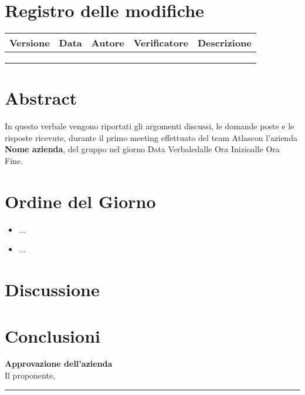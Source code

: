 \documentclass[a4paper,12pt]{article}
\newcommand{\Gruppo}{Atlas}
\newcommand{\DataVerbale}{Data Verbale}
\newcommand{\OraInizio}{Ora Inizio}
\newcommand{\OraFine}{Ora Fine}
\newcommand{\AbstractVerbale}{%
In questo verbale vengono riportati gli argomenti discussi, le domande poste e le risposte ricevute, durante il primo meeting effettuato del team \Gruppo \space con l'azienda \textbf{Nome azienda}, del gruppo nel giorno \DataVerbale \space dalle \OraInizio \space alle \OraFine .
}
\begin{document}
\section*{Registro delle modifiche}{
    \begin{center} 
        \begin{tabular}{|l|l|l|l|l|}
            \hline
            \textbf{Versione} & \textbf{Data} & \textbf{Autore} & \textbf{Verificatore} & \textbf{Descrizione} \\
            \hline
             & & & & \\
            \hline
             & & & & \\
            \hline
             & & & & \\
            \hline
        \end{tabular}
    \end{center}
}

\newpage

\tableofcontents

\newpage
\section{Abstract}{
    \begin{minipage}{0.9\textwidth}
        \small
        \AbstractVerbale
    \end{minipage}
}


\section{Ordine del Giorno}{
    \begin{itemize}
        \item ...
        \item ...
    \end{itemize}
}


\section{Discussione}{
    
}

\section{Conclusioni}{
    
}

\vspace{2cm}
\begin{flushright}
    \textbf{Approvazione dell'azienda} \\
    Il proponente,\\[0.5cm]
    \rule{6cm}{0.4pt}\\
\end{flushright}
\end{document}
